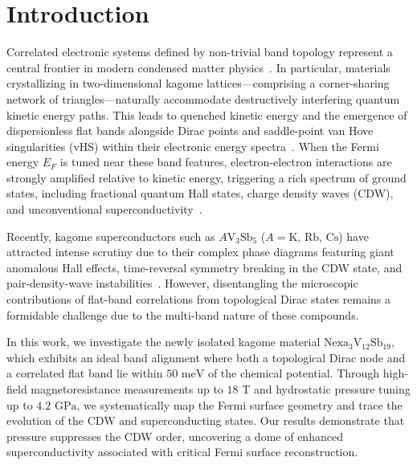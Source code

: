 \documentclass[aps,prb,reprint,superscriptaddress,amsmath,amssymb,citeautoscript]{revtex4-2}
\begin{document}
\section{Introduction}
Correlated electronic systems defined by non-trivial band topology represent a central frontier in modern condensed matter physics~\cite{Hasan2010, Qi2011}. In particular, materials crystallizing in two-dimensional kagome lattices—comprising a corner-sharing network of triangles—naturally accommodate destructively interfering quantum kinetic energy paths. This leads to quenched kinetic energy and the emergence of dispersionless flat bands alongside Dirac points and saddle-point van Hove singularities (vHS) within their electronic energy spectra~\cite{Mielke1991, Ye2018, Yin2022}. When the Fermi energy $E_F$ is tuned near these band features, electron-electron interactions are strongly amplified relative to kinetic energy, triggering a rich spectrum of ground states, including fractional quantum Hall states, charge density waves (CDW), and unconventional superconductivity~\cite{Guo2009, Neupert2011, Wang2013}.

Recently, kagome superconductors such as $A\mathrm{V}_3\mathrm{Sb}_5$ ($A = \text{K, Rb, Cs}$) have attracted intense scrutiny due to their complex phase diagrams featuring giant anomalous Hall effects, time-reversal symmetry breaking in the CDW state, and pair-density-wave instabilities~\cite{Ortiz2019, Ortiz2020, Zhao2021, Chen2021}. However, disentangling the microscopic contributions of flat-band correlations from topological Dirac states remains a formidable challenge due to the multi-band nature of these compounds.

In this work, we investigate the newly isolated kagome material $\mathrm{Nexa}_{3}\mathrm{V}_{12}\mathrm{Sb}_{19}$, which exhibits an ideal band alignment where both a topological Dirac node and a correlated flat band lie within $50\text{~meV}$ of the chemical potential. Through high-field magnetoresistance measurements up to $18\text{~T}$ and hydrostatic pressure tuning up to $4.2\text{~GPa}$, we systematically map the Fermi surface geometry and trace the evolution of the CDW and superconducting states. Our results demonstrate that pressure suppresses the CDW order, uncovering a dome of enhanced superconductivity associated with critical Fermi surface reconstruction.
\end{document}
